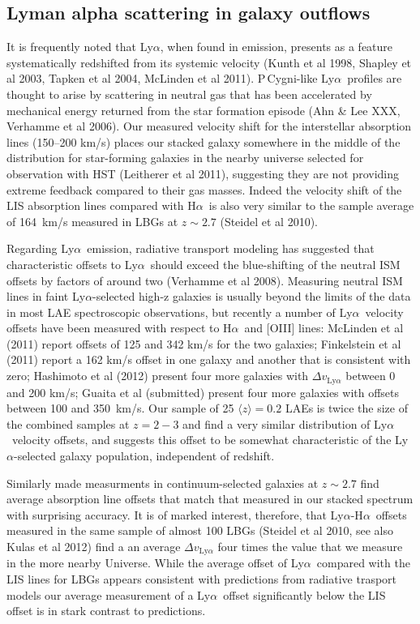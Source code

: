 \documentclass[manuscript]{emulateapj}
\newcommand{\lya}{Ly$\alpha$}
\newcommand{\ha}{H$\alpha$}
\begin{document}
\subsection{Lyman alpha scattering in galaxy outflows} 
It is frequently noted that \lya, when found in emission, presents as
a feature systematically redshifted from its systemic velocity (Kunth
et al 1998, Shapley et al 2003, Tapken et al 2004, McLinden et al
2011).  P\,Cygni-like \lya\ profiles are thought to arise by
scattering in neutral gas that has been accelerated by mechanical
energy returned from the star formation episode (Ahn \& Lee XXX,
Verhamme et al 2006). Our measured velocity shift for the interstellar
absorption lines (150--200 km/s) places our stacked galaxy somewhere
in the middle of the distribution for star-forming galaxies in the
nearby universe selected for observation with HST (Leitherer et al
2011), suggesting they are not providing extreme feedback compared to
their gas masses.  Indeed the velocity shift of the LIS absorption
lines compared with \ha\ is also very similar to the sample average of
164~km/s measured in LBGs at $z\sim 2.7$ (Steidel et al 2010).

Regarding \lya\ emission, radiative transport modeling has suggested
that characteristic offsets to \lya\ should exceed the blue-shifting
of the neutral ISM offsets by factors of around two (Verhamme et al
2008). Measuring neutral ISM lines in faint \lya-selected high-z
galaxies is usually beyond the limits of the data in most LAE
spectroscopic observations, but recently a number of \lya\ velocity
offsets have been measured with respect to \ha\ and [OIII] lines:
McLinden et al (2011) report offsets of 125 and 342 km/s for the two
galaxies; Finkelstein et al (2011) report a 162 km/s offset in one
galaxy and another that is consistent with zero; Hashimoto et al
(2012) present four more galaxies with $\Delta v_{\mathrm{Ly}\alpha}$
between 0 and 200 km/s; Guaita et al (submitted) present four more
galaxies with offsets between 100 and 350~km/s. Our sample of 25
$\langle z\rangle=0.2$ LAEs is twice the size of the combined samples
at $z=2-3$ and find a very similar distribution of \lya\ velocity
offsets, and suggests this offset to be somewhat characteristic of the
\lya-selected galaxy population, independent of redshift.

Similarly made measurments in continuum-selected galaxies at $z\sim 2.7$
find average absorption line offsets that match that measured in
our stacked spectrum with surprising accuracy. It is of marked interest, 
therefore, that \lya-\ha\ offsets measured in the same sample of almost 100
LBGs (Steidel et al 2010, see also Kulas et al 2012) find a an average 
$\Delta v_{\mathrm{Ly}\alpha}$ four times the value that we measure in the 
more nearby Universe. While the average offset of \lya\ compared with the LIS lines for LBGs appears 
consistent with predictions from radiative trasport models our average 
measurement of a \lya\ offset significantly below the LIS offset is in stark
contrast to predictions. 
\end{document}
